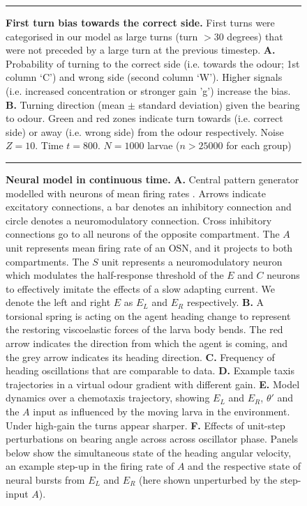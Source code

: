 \documentclass[11pt,a4paper]{article}
\newcommand{\todoBW}[1]{\todo[author=BW,color=orange, size=\tiny,inline]{#1}}
\begin{document}
\begin{figure}
\begin{center}
\caption{{\bf First turn bias towards the correct side.} First turns were categorised in our model as large turns (turn $>30$ degrees) that were not preceded by a large turn at the previous timestep.
{\bf A.} Probability of turning to the correct side (i.e. towards the odour; 1st column ‘C’) and wrong side (second column ‘W’). Higher signals (i.e. increased concentration or stronger gain 'g') increase the bias.
{\bf B.} Turning direction (mean $\pm$ standard deviation) given the bearing to odour. Green and red zones indicate turn towards (i.e. correct side) or away (i.e. wrong side) from the odour respectively. Noise $Z = 10$. Time $t=800$. $N=1000$ larvae ($n > 25000$ for each group)
\label{fig:FirstTurn}}
\hrule
\end{center}
\end{figure}


\begin{figure}
\begin{center}
\caption{{\bf Neural model in continuous time.} {\bf A.} Central pattern generator modelled with neurons of mean firing rates  \citep[adapted from ][]{wilson1999spikes}.
  Arrows indicate excitatory connections, a bar denotes an inhibitory connection and circle denotes a neuromodulatory connection. Cross inhibitory connections go to all neurons of the opposite compartment.
   The $A$ unit represents mean firing rate of an OSN, and it projects to both compartments.
   The $S$ unit represents a neuromodulatory neuron which  modulates the half-response threshold of the $E$ and $C$ neurons  to effectively imitate the effects of a slow adapting current. We denote the left and right $E$ as $E_L$ and $E_R$ respectively.
{\bf B.} A torsional spring is acting on the agent heading change to represent the restoring viscoelastic forces of the larva body bends. The red arrow indicates the direction from which the agent is coming, and the grey arrow indicates its heading direction.
{\bf C.} Frequency of heading oscillations that are comparable to data.
{\bf D.} Example taxis trajectories in a virtual odour gradient with different gain.
{\bf E.} Model dynamics over a chemotaxis trajectory, showing $E_L$ and  $E_R$, $\theta'$ and the $A$ input as influenced by the moving larva in the environment. Under high-gain the turns appear sharper.
{\bf F.} Effects of unit-step perturbations on bearing angle across across oscillator phase.
 Panels below show the simultaneous state of the heading angular velocity, an example step-up in the firing rate of $A$ and the respective state of neural bursts from $E_L$ and $E_R$ (here shown unperturbed by the step-input $A$).
\label{fig:LampreyModel}}
\hrule
\end{center}
\end{figure}
\end{document}
